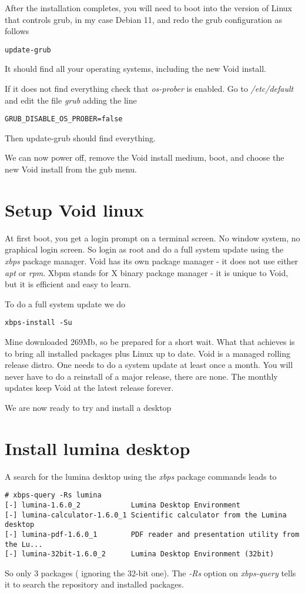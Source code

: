 \documentclass{article}  %
\begin{document}
After the installation completes, you will need to boot into the version of Linux that controls grub, in my case Debian 11, and redo the grub configuration as follows
\begin{verbatim}
update-grub
\end{verbatim}
It should find all your operating systems, including the new Void install. 

If it does not find everything check that {\em os-prober} is enabled. Go to {\em /etc/default} and edit the file {\em grub} adding the line
\begin{verbatim}
GRUB_DISABLE_OS_PROBER=false
\end{verbatim}
Then update-grub should find everything.

We can now power off, remove the Void install medium, boot, and choose the new Void install from the gub menu.


\section{Setup Void linux}
At first boot, you get a login prompt on a terminal screen. No window system, no graphical login screen. So login as root and do a full system update using the {\em xbps} package manager. Void has its own package manager - it does not use either {\em apt} or {\em rpm}. Xbpm stands for X binary package manager - it is unique to Void, but it is efficient and easy to learn. 

To do a full system update we do
\begin{verbatim}
xbps-install -Su
\end{verbatim}
Mine downloaded 269Mb, so be prepared for a short wait. 
What that achieves is to bring all installed packages plus Linux up to date. Void is a managed rolling release distro. One needs to do a system update at least once a month. You will never have to do a reinstall of a major release, there are none. The monthly updates keep Void at the latest release forever.

We are now ready to try and install a desktop

\section{Install lumina desktop}
A search for the lumina desktop using the {\em xbps} package commands leads to
\begin{verbatim}
# xbps-query -Rs lumina
[-] lumina-1.6.0_2            Lumina Desktop Environment
[-] lumina-calculator-1.6.0_1 Scientific calculator from the Lumina desktop
[-] lumina-pdf-1.6.0_1        PDF reader and presentation utility from the Lu...
[-] lumina-32bit-1.6.0_2      Lumina Desktop Environment (32bit)
\end{verbatim}
 So only 3 packages ( ignoring the 32-bit one). The {\em -Rs} option on {\em xbps-query} tells it to search the repository and installed packages. 
\end{document}
